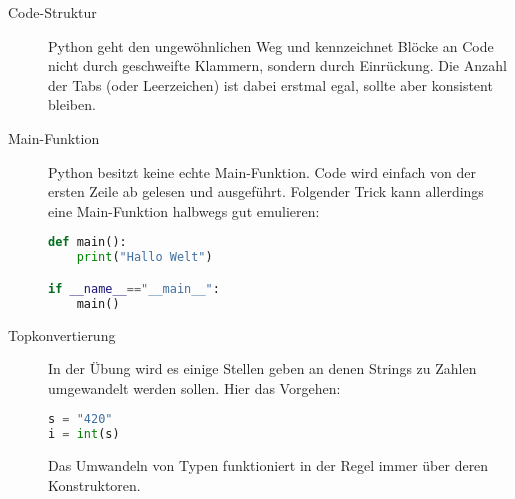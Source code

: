 \documentclass[columns=3]{cheatsheet}
\begin{document}
\begin{description}
	\item[Code-Struktur] Python geht den ungewöhnlichen Weg und kennzeichnet Blöcke an Code nicht durch geschweifte
		Klammern, sondern durch Einrückung. Die Anzahl der Tabs (oder Leerzeichen) ist dabei erstmal egal, sollte
		aber konsistent bleiben.
	\item[Main-Funktion] Python besitzt keine echte Main-Funktion. Code wird einfach von der ersten Zeile ab gelesen
		und ausgeführt. Folgender Trick kann allerdings eine Main-Funktion halbwegs gut emulieren:
		\begin{lstlisting}[language=python]
def main():
	print("Hallo Welt")

if __name__=="__main__":
	main()
		\end{lstlisting}
	\item[Topkonvertierung] In der Übung wird es einige Stellen geben an denen Strings zu Zahlen umgewandelt werden sollen.
		Hier das Vorgehen:
		\begin{lstlisting}[language=python]
s = "420"
i = int(s)
		\end{lstlisting}
		Das Umwandeln von Typen funktioniert in der Regel immer über deren Konstruktoren.


\end{description}
\end{document}
